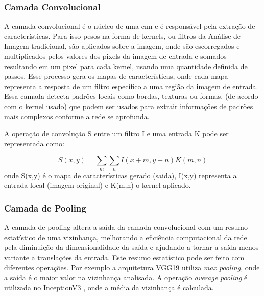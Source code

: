 \subsubsection{Camada Convolucional}

A camada convolucional é o núcleo de uma \acrshort{cnn} e é responsável pela extração de características. 
Para isso pesos na forma de kernels, ou filtros da Análise de Imagem tradicional, 
são aplicados sobre a imagem, onde são escorregados e multiplicados pelos valores dos pixels da imagem de entrada e somados resultando em um pixel para cada kernel, 
usando uma quantidade definida de passos. Esse processo gera os mapas de características, onde cada mapa representa a resposta de um filtro específico a uma região da imagem de entrada. 
Essa camada detecta padrões locais como bordas, texturas ou formas, (de acordo com o kernel usado) que podem ser usados para extrair informações de padrões mais complexos conforme a rede se aprofunda.

A operação de convolução S entre um filtro I e uma entrada K pode ser representada como:

\begin{equation}
    \label{eqn:convolution}
    S(x,y) = \sum_{m}\sum_{n}I(x+m,y+n)K(m,n)
\end{equation}
onde S(x,y) é o mapa de características gerado (saida), I(x,y) representa a entrada local (imagem original) e K(m,n) o kernel aplicado.
\subsubsection{Camada de Pooling}


A camada de pooling altera a saída da camada convolucional com um resumo estatístico de uma vizinhança, melhorando a eficiência computacional da rede pela diminuição da dimensionalidade da saída e ajudando a tornar a saída menos variante a translações da entrada.
Este resumo estatístico pode ser feito com diferentes operações. Por exemplo a arquitetura VGG19 \cite{vgg} utiliza \textit{max pooling}, onde a saída é o maior valor na vizinhança analisada. A operação \textit{average pooling} é utilizada no InceptionV3 \cite{inceptionv3}, onde a média da vizinhança é calculada.


